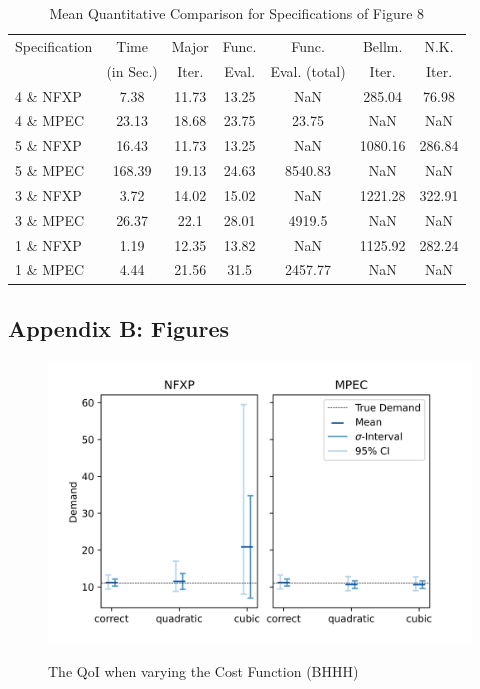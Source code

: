 \begin{table}[H]
	\centering
	\caption{Mean Quantitative Comparison for Specifications of Figure 8}
	\label{table4}
	\begin{tabular}{l | c c c c c c}
		\toprule\midrule
		Specification & Time & Major & Func. & Func. & Bellm. & N.K.   \\
		& (in Sec.) & Iter. & Eval. & Eval. (total) & Iter. & Iter. \\
		\midrule
		4 \& NFXP & 7.38 & 11.73 &	13.25 &	NaN & 285.04 & 76.98 \\
		4 \& MPEC & 23.13 & 18.68 & 23.75 & 23.75 & NaN & NaN \\
		5 \& NFXP & 16.43 &  11.73 & 13.25 & NaN & 1080.16 & 286.84 \\
		5 \& MPEC & 168.39 & 19.13 &	24.63 &	8540.83 & NaN &	NaN \\
		3 \& NFXP & 3.72 & 14.02 & 15.02 & NaN &	1221.28 & 322.91 \\
		3 \& MPEC & 26.37 & 22.1 & 28.01 & 4919.5 & NaN & NaN \\
		1 \& NFXP & 1.19 & 12.35 & 13.82 & NaN &	1125.92 & 282.24 \\
		1 \& MPEC & 4.44 & 21.56 & 31.5 & 2457.77 & NaN & NaN \\
		\bottomrule
	\end{tabular}
\end{table}

\newpage
\subsection{Appendix B: Figures}

\begin{figure}[H]
	\caption{The QoI when varying the Cost Function (BHHH)}
	\vspace*{-4mm}
	\centering
	\includegraphics[scale=0.9]{../figures/figure_12.png}
	\label{figure12}
\end{figure}

